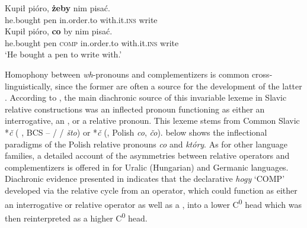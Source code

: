\documentclass[output=paper]{langsci/langscibook}
\begin{document}
\ea%
    \label{ex:leska:5}
    \ea
    \gll Kupił   pióro,  \textbf{żeby} nim   pisać.\\
         he.bought   pen   in.order.to   with.it.\textsc{ins}  write\\
    \ex
    \gll Kupił   pióro,   \textbf{co}   by   nim   pisać.\\
         he.bought   pen   \textsc{comp} in.order.to   with.it.\textsc{ins}  write\\
    \glt ‘He bought a pen to write with.’
    \z
\z

Homophony between \textit{wh}{}-pronouns and complementizers is common cross-linguistically, since the former are often a source for the development of the latter \citep[108]{Citko2004}. According to \citet{Minlos2012}, the main diachronic source of this invariable lexeme in Slavic relative constructions was an inflected pronoun functioning as either an interrogative, an , or a relative pronoun. This lexeme stems from Common Slavic *\textit{č }( \textit{}, BCS –  /  /  \textit{što}) or *\textit{č }(, Polish \textit{co},  \textit{čo}).  below shows the inflectional paradigms of the Polish relative pronouns \textit{co} and \textit{który}. As for other language families, a detailed account of the asymmetries between relative operators and complementizers is offered in \citet{Bacskai-Atkari2016} for Uralic (Hungarian) and Germanic languages. Diachronic evidence presented in \citet{Bacskai-Atkari2016} indicates that the  declarative  \textit{hogy} ‘COMP’ developed via the relative cycle from an operator, which could function as either an interrogative or relative operator as well as a , into a lower C\textsuperscript{0} head which was then reinterpreted as a higher C\textsuperscript{0} head. 
\end{document}
